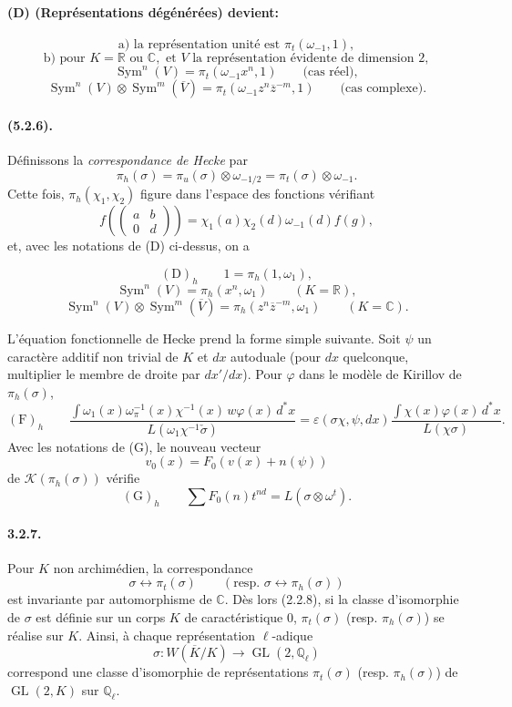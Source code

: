 \documentclass[10pt,a4paper]{article}
\providecommand{\GL}{\operatorname{GL}}
\providecommand{\Sym}{\operatorname{Sym}}
\providecommand{\R}{\mathbb R}
\providecommand{\Q}{\mathbb Q}
\providecommand{\C}{\mathbb C}
\providecommand{\calK}{\mathcal K}
\begin{document}
\paragraph{(D) (Représentations dégénérées) devient:}
\[
\text{a) la représentation unité est }\pi_t(\omega_{-1},1),
\]
\[
\text{b) pour }K=\R\text{ ou }\C,\text{ et }V\text{ la représentation évidente de dimension }2,
\]
\[
\Sym^n(V)=\pi_t(\omega_{-1}x^n,1)\qquad\text{(cas réel)},
\]
\[
\Sym^n(V)\otimes\Sym^m(\overline V)
=\pi_t(\omega_{-1}z^n\overline z^{-m},1)
\qquad\text{(cas complexe)}.
\]

\paragraph{(5.2.6).} Définissons la \emph{correspondance de Hecke} par
\[
\pi_h(\sigma)=\pi_u(\sigma)\otimes\omega_{-1/2}
=\pi_t(\sigma)\otimes\omega_{-1}.
\]
Cette fois, \(\pi_h(\chi_1,\chi_2)\) figure dans l'espace des fonctions vérifiant
\[
f\!\left(\begin{pmatrix}a&b\\0&d\end{pmatrix}\right)
=\chi_1(a)\chi_2(d)\omega_{-1}(d)f(g),
\]
et, avec les notations de (D) ci-dessus, on a

\clearpage
{}
\hypertarget{authority-47}{}
\[
\mathrm{(D)}_h\qquad
1=\pi_h(1,\omega_1),
\]
\[
\Sym^n(V)=\pi_h(x^n,\omega_1)\qquad(K=\R),
\]
\[
\Sym^n(V)\otimes\Sym^m(\overline V)
=\pi_h(z^n\overline z^{-m},\omega_1)\qquad(K=\C).
\]

L'équation fonctionnelle de Hecke prend la forme simple suivante. Soit \(\psi\) un caractère additif non trivial de \(K\) et \(dx\) autoduale (pour \(dx\) quelconque, multiplier le membre de droite par \(dx'/dx\)). Pour \(\varphi\) dans le modèle de Kirillov de \(\pi_h(\sigma)\),
\[
\mathrm{(F)}_h\qquad
\frac{\displaystyle\int \omega_1(x)\omega_\pi^{-1}(x)\chi^{-1}(x)\,w\varphi(x)\,d^*x}
     {L(\omega_1\chi^{-1}\check\sigma)}
=
\varepsilon(\sigma\chi,\psi,dx)
\frac{\displaystyle\int \chi(x)\varphi(x)\,d^*x}{L(\chi\sigma)}.
\]
Avec les notations de (G), le nouveau vecteur
\[
v_0(x)=F_0(v(x)+n(\psi))
\]
de \(\calK(\pi_h(\sigma))\) vérifie
\[
\mathrm{(G)}_h\qquad
\sum F_0(n)t^{nd}=L(\sigma\otimes\omega^t).
\]

\paragraph{3.2.7.} Pour \(K\) non archimédien, la correspondance
\[
\sigma\longleftrightarrow\pi_t(\sigma)\qquad(\text{resp. }\sigma\longleftrightarrow\pi_h(\sigma))
\]
est invariante par automorphisme de \(\C\). Dès lors (2.2.8), si la classe d'isomorphie de \(\sigma\) est définie sur un corps \(K\) de caractéristique \(0\), \(\pi_t(\sigma)\) (resp. \(\pi_h(\sigma)\)) se réalise sur \(K\). Ainsi, à chaque représentation \(\ell\)-adique
\[
\sigma:W(\overline K/K)\longrightarrow\GL(2,\Q_\ell)
\]
correspond une classe d'isomorphie de représentations \(\pi_t(\sigma)\) (resp. \(\pi_h(\sigma)\)) de \(\GL(2,K)\) sur \(\Q_\ell\).
\end{document}
